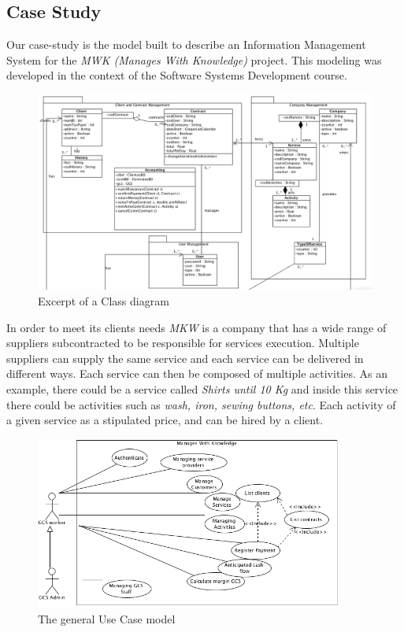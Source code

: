 \subsection*{Case Study}
Our case-study is the model built to describe an Information Management System for the \textit{MWK (Manages With Knowledge)} project. This modeling was developed in the context of the Software Systems Development course. 

\begin{figure}[!htbp]
\begin{center}
\includegraphics[scale=0.345]{images/classbw.png}
\caption{Excerpt of a Class diagram}\label{fig:class}
\end{center}
\end{figure} 

In order to meet its clients needs \emph{MKW} is a company that has a wide range of suppliers subcontracted to be responsible for services execution.
Multiple suppliers can supply the same service and each service can be delivered in different ways.
Each service can then be composed of multiple activities. As an example, there could be a service called \textit{Shirts until 10 Kg} and inside this service there could be activities such as \textit{wash, iron, sewing buttons, etc}.
Each activity of a given service as a stipulated price, and can be hired by a client.

\begin{figure}[!htbp]
\begin{center}
\includegraphics[width=0.9\textwidth]{images/usecase.png}
\caption{The general Use Case model}\label{fig:usecase}
\end{center}
\end{figure} 

